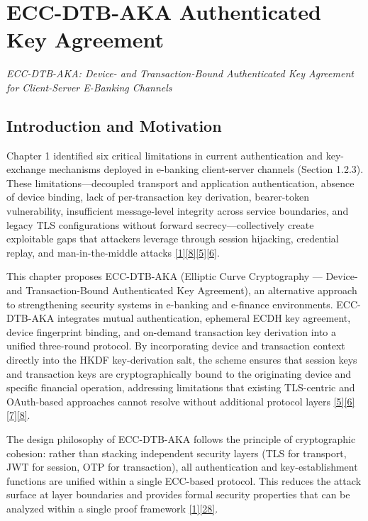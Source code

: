 \chapter{ECC-DTB-AKA Authenticated Key Agreement}
\label{ch:chapter02}

\noindent\textit{ECC-DTB-AKA: Device- and Transaction-Bound Authenticated Key Agreement for Client-Server E-Banking Channels}\par\vspace{1em}

\section{Introduction and Motivation}

\indent Chapter 1 identified six critical limitations in current authentication and key-exchange mechanisms deployed in e-banking client-server channels (Section 1.2.3). These limitations---decoupled transport and application authentication, absence of device binding, lack of per-transaction key derivation, bearer-token vulnerability, insufficient message-level integrity across service boundaries, and legacy TLS configurations without forward secrecy---collectively create exploitable gaps that attackers leverage through session hijacking, credential replay, and man-in-the-middle attacks \hyperref[ref:1]{[1]}\hyperref[ref:8]{[8]}\hyperref[ref:5]{[5]}\hyperref[ref:6]{[6]}.

\indent This chapter proposes ECC-DTB-AKA (Elliptic Curve Cryptography --- Device- and Transaction-Bound Authenticated Key Agreement), an alternative approach to strengthening security systems in e-banking and e-finance environments. ECC-DTB-AKA integrates mutual authentication, ephemeral ECDH key agreement, device fingerprint binding, and on-demand transaction key derivation into a unified three-round protocol. By incorporating device and transaction context directly into the HKDF key-derivation salt, the scheme ensures that session keys and transaction keys are cryptographically bound to the originating device and specific financial operation, addressing limitations that existing TLS-centric and OAuth-based approaches cannot resolve without additional protocol layers \hyperref[ref:5]{[5]}\hyperref[ref:6]{[6]}\hyperref[ref:7]{[7]}\hyperref[ref:8]{[8]}.

\indent The design philosophy of ECC-DTB-AKA follows the principle of cryptographic cohesion: rather than stacking independent security layers (TLS for transport, JWT for session, OTP for transaction), all authentication and key-establishment functions are unified within a single ECC-based protocol. This reduces the attack surface at layer boundaries and provides formal security properties that can be analyzed within a single proof framework \hyperref[ref:1]{[1]}\hyperref[ref:28]{[28]}.

